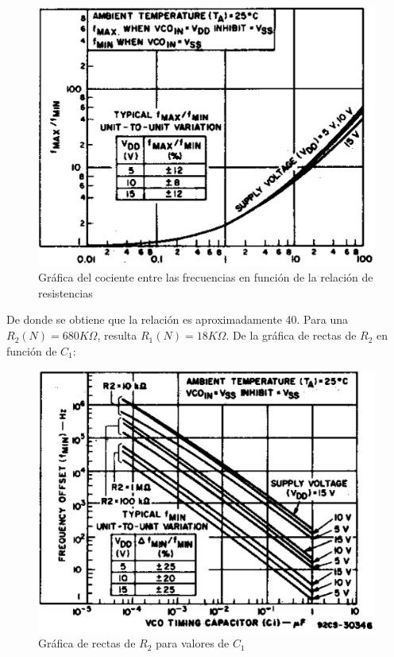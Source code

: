 \documentclass[assd_tp3_main.tex]{subfiles}
\begin{document}
\begin{figure}[!ht]
\begin{centering}
\includegraphics[scale=0.4]{images/ej5/f2f1.png}
\par\end{centering}
\caption{Gráfica del cociente entre las frecuencias en función de la relación de resistencias}
\end{figure}

De donde se obtiene que la relación es aproximadamente 40. Para una $R_2(N) = 680K\Omega$, resulta $R_1(N) = 18K\Omega$.
\newpage
De la gráfica de rectas de $R_2$ en función de $C_1$:

\begin{figure}[!ht]
\begin{centering}
\includegraphics[scale=0.4]{images/ej5/r2c1.png}
\par\end{centering}
\caption{Gráfica de rectas de $R_2$ para valores de $C_1$}
\end{figure}
\end{document}
